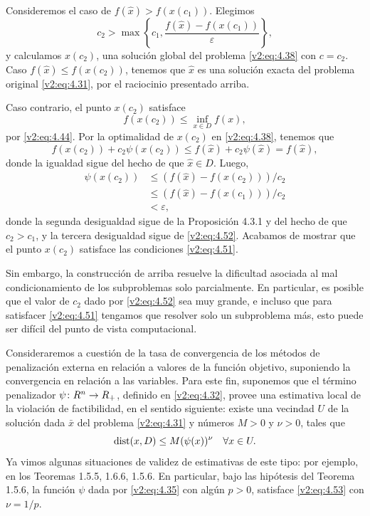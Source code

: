 Consideremos el caso de $f(\hat{x}) > f(x(c_1))$. Elegimos
\begin{equation}
    c_2 > \max\left\{ c_1, \frac{f(\hat{x}) - f(x(c_1))}{\varepsilon} \right\},
    \label{v2:eq:4.52}
\end{equation}
y calculamos $x(c_2)$, una solución global del problema \eqref{v2:eq:4.38} con $c = c_2$.
Caso $f(\hat{x}) \le f(x(c_2))$, tenemos que $\hat{x}$ es una solución exacta del problema original \eqref{v2:eq:4.31}, por el raciocinio presentado arriba.

Caso contrario, el punto $x(c_2)$ satisface
\[
    f(x(c_2)) \le \inf_{x \in D} f(x),
\]
por \eqref{v2:eq:4.44}. Por la optimalidad de $x(c_2)$ en \eqref{v2:eq:4.38}, tenemos que
\[
    f(x(c_2)) + c_2\psi(x(c_2)) \le f(\hat{x}) + c_2\psi(\hat{x}) = f(\hat{x}),
\]
donde la igualdad sigue del hecho de que $\hat{x} \in D$. Luego,
\begin{align*}
    \psi(x(c_2)) &\le (f(\hat{x}) - f(x(c_2)))/c_2 \\
    &\le (f(\hat{x}) - f(x(c_1)))/c_2 \\
    &< \varepsilon,
\end{align*}
donde la segunda desigualdad sigue de la Proposición 4.3.1 y del hecho de que $c_2 > c_1$, y la tercera desigualdad sigue de \eqref{v2:eq:4.52}. Acabamos de mostrar que el punto $x(c_2)$ satisface las condiciones \eqref{v2:eq:4.51}.

Sin embargo, la construcción de arriba resuelve la dificultad asociada al mal condicionamiento de los subproblemas solo parcialmente. En particular, es posible que el valor de $c_2$ dado por \eqref{v2:eq:4.52} sea muy grande, e incluso que para satisfacer \eqref{v2:eq:4.51} tengamos que resolver solo un subproblema más, esto puede ser difícil del punto de vista computacional.

Consideraremos a cuestión de la tasa de convergencia de los métodos de penalización externa en relación a valores de la función objetivo, suponiendo la convergencia en relación a las variables. Para este fin, suponemos que el término penalizador $\psi \colon R^n \to R_+$, definido en \eqref{v2:eq:4.32}, provee una estimativa local de la violación de factibilidad, en el sentido siguiente: existe una vecindad $U$ de la solución dada $\bar{x}$ del problema \eqref{v2:eq:4.31} y números $M > 0$ y $\nu > 0$, tales que
\begin{equation}
    \operatorname{dist}(x, D) \le M(\psi(x))^\nu \quad \forall x \in U.
    \label{v2:eq:4.53}
\end{equation}
Ya vimos algunas situaciones de validez de estimativas de este tipo: por ejemplo, en los Teoremas 1.5.5, 1.6.6, 1.5.6. En particular, bajo las hipótesis del Teorema 1.5.6, la función $\psi$ dada por \eqref{v2:eq:4.35} con algún $p > 0$, satisface \eqref{v2:eq:4.53} con $\nu = 1/p$.

